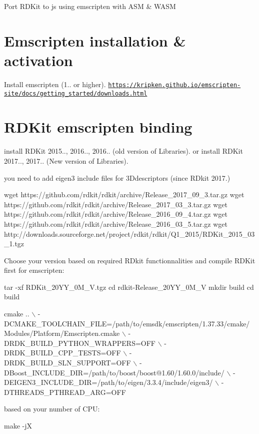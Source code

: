 Port R\+D\+Kit to js using emscripten with A\+SM \& W\+A\+SM

\section*{Emscripten installation \& activation }

Install emscripten (1.. or higher). \href{https://kripken.github.io/emscripten-site/docs/getting_started/downloads.html}{\tt https\+://kripken.\+github.\+io/emscripten-\/site/docs/getting\+\_\+started/downloads.\+html}

\section*{R\+D\+Kit emscripten binding }

install R\+D\+Kit 2015.., 2016.., 2016.. (old version of Libraries). or install R\+D\+Kit 2017.., 2017.. (New version of Libraries).

you need to add eigen3 include files for 3\+Ddescriptors (since R\+Dkit 2017.)


\begin{DoxyCode}
wget https://github.com/rdkit/rdkit/archive/Release\_2017\_09\_3.tar.gz
wget https://github.com/rdkit/rdkit/archive/Release\_2017\_03\_3.tar.gz
wget https://github.com/rdkit/rdkit/archive/Release\_2016\_09\_4.tar.gz
wget https://github.com/rdkit/rdkit/archive/Release\_2016\_03\_5.tar.gz
wget http://downloads.sourceforge.net/project/rdkit/rdkit/Q1\_2015/RDKit\_2015\_03\_1.tgz
\end{DoxyCode}


Choose your version based on required R\+Dkit functionnalities and compile R\+D\+Kit first for emscripten\+: 
\begin{DoxyCode}
tar -xf RDKit\_20YY\_0M\_V.tgz
cd rdkit-Release\_20YY\_0M\_V
mkdir build
cd build


cmake  .. \(\backslash\)
-DCMAKE\_TOOLCHAIN\_FILE=/path/to/emsdk/emscripten/1.37.33/cmake/Modules/Platform/Emscripten.cmake \(\backslash\)
-DRDK\_BUILD\_PYTHON\_WRAPPERS=OFF \(\backslash\)
-DRDK\_BUILD\_CPP\_TESTS=OFF \(\backslash\)
-DRDK\_BUILD\_SLN\_SUPPORT=OFF \(\backslash\)
-DBoost\_INCLUDE\_DIR=/path/to/boost/boost@1.60/1.60.0/include/ \(\backslash\)
-DEIGEN3\_INCLUDE\_DIR=/path/to/eigen/3.3.4/include/eigen3/ \(\backslash\)
-DTHREADS\_PTHREAD\_ARG=OFF
\end{DoxyCode}


based on your number of C\+PU\+: 
\begin{DoxyCode}
make -jX
\end{DoxyCode}


